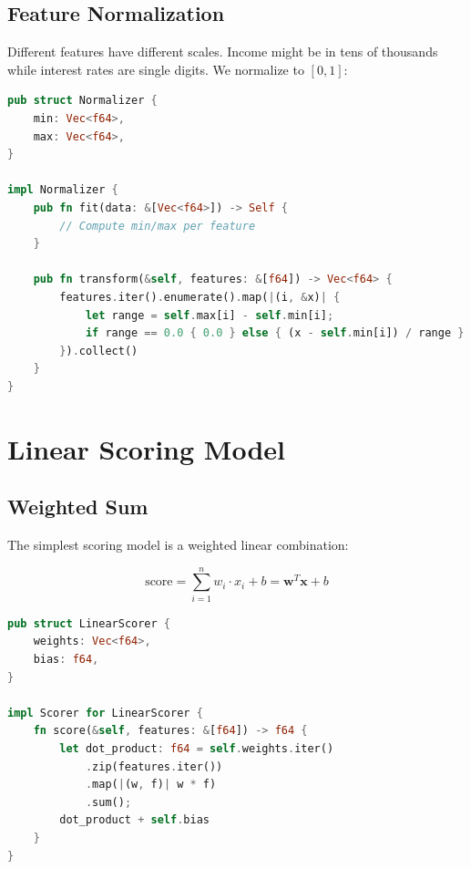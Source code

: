 \subsection{Feature Normalization}


Different features have different scales. Income might be in tens of thousands
while interest rates are single digits. We normalize to $[0, 1]$:

\begin{lstlisting}[language=Rust]
pub struct Normalizer {
    min: Vec<f64>,
    max: Vec<f64>,
}

impl Normalizer {
    pub fn fit(data: &[Vec<f64>]) -> Self {
        // Compute min/max per feature
    }

    pub fn transform(&self, features: &[f64]) -> Vec<f64> {
        features.iter().enumerate().map(|(i, &x)| {
            let range = self.max[i] - self.min[i];
            if range == 0.0 { 0.0 } else { (x - self.min[i]) / range }
        }).collect()
    }
}
\end{lstlisting}

\section{Linear Scoring Model}

\subsection{Weighted Sum}

The simplest scoring model is a weighted linear combination:

\[
\text{score} = \sum_{i=1}^{n} w_i \cdot x_i + b = \mathbf{w}^T \mathbf{x} + b
\]


\begin{lstlisting}[language=Rust]
pub struct LinearScorer {
    weights: Vec<f64>,
    bias: f64,
}

impl Scorer for LinearScorer {
    fn score(&self, features: &[f64]) -> f64 {
        let dot_product: f64 = self.weights.iter()
            .zip(features.iter())
            .map(|(w, f)| w * f)
            .sum();
        dot_product + self.bias
    }
}
\end{lstlisting}

